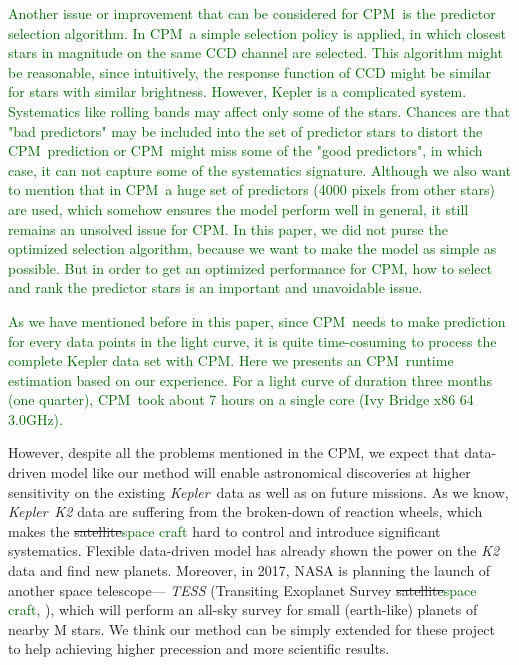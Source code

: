 \documentclass[12pt, preprint]{aastex}
\newcommand{\project}[1]{\textsl{#1}}
\newcommand{\Kepler}{\project{Kepler}}
\newcommand{\name}{CPM}
\newcommand{\revise}[1]{\textcolor{darkgreen}{#1}}
\newcommand{\remove}[1]{\sout{#1}}
\begin{document}
\revise{Another issue or improvement that can be considered for \name\ is the predictor selection algorithm. 
In \name\, a simple selection policy is applied, in which closest stars in magnitude on the same CCD channel are selected. This algorithm might be reasonable, since intuitively, the response function of CCD might be similar for stars with similar brightness. 
However, Kepler is a complicated system. Systematics like rolling bands may affect only some of the stars. Chances are that "bad predictors" may be included into the set of predictor stars to distort the \name\ prediction or \name\ might miss some of the "good predictors", in which case, it can not capture some of the systematics signature. Although we also want to mention that in \name\, a huge set of predictors (4000 pixels from other stars) are used, which somehow ensures the model perform well in general, it still remains an unsolved issue for \name.
In this paper, we did not purse the optimized selection algorithm, because we want to make the model as simple as possible. But in order to get an optimized performance for \name, how to select and rank the predictor stars is an important and unavoidable issue.}

\revise{As we have mentioned before in this paper,  since \name\ needs to make prediction for every data points in the light curve, it is quite time-cosuming to process the complete Kepler data set with \name. Here we presents an \name\ runtime estimation based on our experience.  For a light curve of duration three months (one quarter), \name\ took about 7 hours on a single core (Ivy Bridge x86 64 3.0GHz).}

However, despite all the problems mentioned in the \name,
  we expect that data-driven model like our method will enable astronomical discoveries 
  at higher sensitivity on the existing \Kepler\ data as well as on future missions.  
As we know, \Kepler\ \project{K2} \citep{k2} data are suffering from the broken-down of reaction wheels, 
  which makes the \remove{satellite}\revise{space craft} hard to control and introduce significant systematics. 
Flexible data-driven model \citep{dfm} has already shown the power on the \project{K2} data 
  and find new planets.
Moreover, in 2017, NASA is planning the launch of another space telescope---
  \project{TESS} (Transiting Exoplanet Survey \remove{satellite}\revise{space craft}, \cite{tess}), 
  which will perform an all-sky survey for small (earth-like) planets of nearby M stars. 
  We think our method can be simply extended for these project to help achieving higher precession and more scientific results. 
\end{document}
